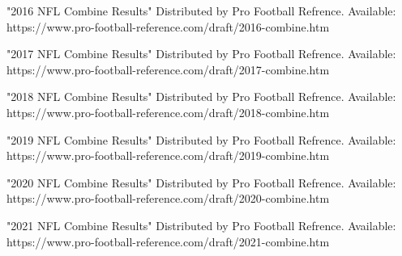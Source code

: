 \documentclass[confrence]{IEEEtran}
\begin{document}
"2016 NFL Combine Results" Distributed by Pro Football Refrence. Available: https://www.pro-football-reference.com/draft/2016-combine.htm

"2017 NFL Combine Results" Distributed by Pro Football Refrence. Available: https://www.pro-football-reference.com/draft/2017-combine.htm

"2018 NFL Combine Results" Distributed by Pro Football Refrence. Available: https://www.pro-football-reference.com/draft/2018-combine.htm

"2019 NFL Combine Results" Distributed by Pro Football Refrence. Available: https://www.pro-football-reference.com/draft/2019-combine.htm

"2020 NFL Combine Results" Distributed by Pro Football Refrence. Available: https://www.pro-football-reference.com/draft/2020-combine.htm

"2021 NFL Combine Results" Distributed by Pro Football Refrence. Available: https://www.pro-football-reference.com/draft/2021-combine.htm
\end{document}
